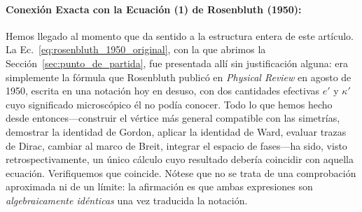 \documentclass[10pt,a4paper]{article}
\begin{document}
\paragraph{Conexión Exacta con la Ecuación (1) de Rosenbluth (1950):}
Hemos llegado al momento que da sentido a la estructura entera de este artículo. La Ec.~\eqref{eq:rosenbluth_1950_original}, con la que abrimos la Sección~\ref{sec:punto_de_partida}, fue presentada allí sin justificación alguna: era simplemente la fórmula que Rosenbluth publicó en \textit{Physical Review} en agosto de 1950, escrita en una notación hoy en desuso, con dos cantidades efectivas $e'$ y $\kappa'$ cuyo significado microscópico él no podía conocer. Todo lo que hemos hecho desde entonces---construir el vértice más general compatible con las simetrías, demostrar la identidad de Gordon, aplicar la identidad de Ward, evaluar trazas de Dirac, cambiar al marco de Breit, integrar el espacio de fases---ha sido, visto retrospectivamente, un único cálculo cuyo resultado debería coincidir con aquella ecuación. Verifiquemos que coincide. Nótese que no se trata de una comprobación aproximada ni de un límite: la afirmación es que ambas expresiones son \emph{algebraicamente idénticas} una vez traducida la notación.
\end{document}
